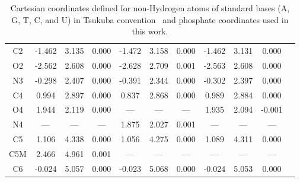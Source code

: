 \begin{table}[htb]
\begin{center}
\begin{small}
\begin{tabular}{|c|c|c|c|c|c|c|c|c|c|c|}
 C2 & -1.462 & 3.135 & 0.000 & -1.472 & 3.158 & 0.000 & -1.462 & 3.131 & 0.000 \\ 
 O2 & -2.562 & 2.608 & 0.000 & -2.628 & 2.709 &0.001 & -2.563 & 2.608 & 0.000 \\ 
 N3 & -0.298 & 2.407 & 0.000 &  -0.391 & 2.344  &0.000 & -0.302 & 2.397 & 0.000  \\
 C4 & 0.994 & 2.897 & 0.000 &  0.837 & 2.868  & 0.000& 0.989 & 2.884 & 0.000  \\ 
 O4 & 1.944 & 2.119 & 0.000 & --- & --- &--- & 1.935 & 2.094 & -0.001  \\
 N4 & --- & --- & --- & 1.875 & 2.027 &0.001 & --- & --- &--- \\ 
 C5 & 1.106 & 4.338 & 0.000 & 1.056 & 4.275 & 0.000 & 1.089 & 4.311 & 0.000 \\ 
 C5M & 2.466 & 4.961 & 0.001 & --- & --- &---& --- & --- &--- \\
 C6 & -0.024 & 5.057 & 0.000 & -0.023 & 5.068 & 0.000 & -0.024 & 5.053 & 0.000 \\ 
\hline
\end{tabular}
\end{small}
\end{center}
\caption{Cartesian coordinates defined for non-Hydrogen atoms of standard bases (A, G, T, C, and U) in Tsukuba convention~\cite{tsukuba} and phosphate coordinates used in this work.}
\label{a1:t1}
\end{table}
\clearpage
